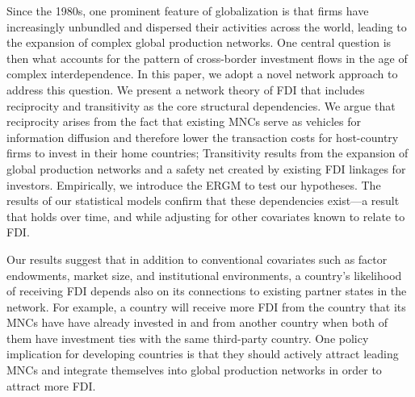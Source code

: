 \documentclass[reqno,onecolumn,letterpaper,12pt]{article}
\begin{document}
Since the 1980s, one prominent feature of globalization is that firms have increasingly unbundled and dispersed their activities across the world, leading to the expansion of complex global production networks. One central question is then what accounts for the pattern of cross-border investment flows in the age of complex interdependence. In this paper, we adopt a novel network approach to address this question. %
We present a network theory of FDI that includes reciprocity and transitivity as the core structural dependencies. We argue that reciprocity arises from the fact %
that existing MNCs serve as vehicles for information diffusion and therefore lower the transaction costs for host-country firms to invest in their home countries; Transitivity results from the expansion of global production networks and a safety net created by existing FDI linkages for investors. %
Empirically, we introduce the ERGM to test our hypotheses. The results of our statistical models confirm that these dependencies exist---a result that holds over time, and while adjusting for other covariates known to relate to FDI.

Our results suggest that in addition to conventional covariates such as factor endowments, market size, and institutional environments, a country's likelihood of receiving FDI depends also on its connections to existing partner states in the network. For example, a country will receive more FDI from the country that its MNCs have have already invested in and from another country when both of them have investment ties with the same third-party country. One policy implication for developing countries is that they should actively attract leading MNCs and integrate themselves into global production networks in order to attract more FDI.

\end{document}
